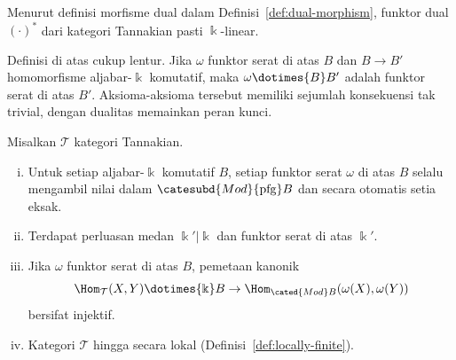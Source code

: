 Menurut definisi morfisme dual dalam Definisi~\ref{def:dual-morphism},
funktor dual $(\mathord\cdot)^*$ dari kategori Tannakian pasti
$\Bbbk$-linear.

Definisi di atas cukup lentur. Jika $\omega$ funktor serat di atas $B$
dan $B\to B'$ homomorfisme aljabar-$\Bbbk$ komutatif, maka
$\omega\dotimes{B}B'$ adalah funktor serat di atas $B'$. Aksioma-aksioma
tersebut memiliki sejumlah konsekuensi tak trivial, dengan dualitas
memainkan peran kunci.

\begin{lemma}\label{prop:Tannaka-generalities}
	Misalkan $\mathcal{T}$ kategori Tannakian.
	\begin{enumerate}[(i)]
		\item Untuk setiap aljabar-$\Bbbk$ komutatif $B$, setiap funktor serat
		$\omega$ di atas $B$ selalu mengambil nilai dalam
		$\catesubd{Mod}{\mathrm{pfg}}B$ dan secara otomatis setia eksak.
		\item Terdapat perluasan medan $\Bbbk'|\Bbbk$ dan funktor serat di
		atas $\Bbbk'$.
		\item Jika $\omega$ funktor serat di atas $B$, pemetaan kanonik
		\[ \Hom_{\mathcal{T}}(X,Y)\dotimes{\Bbbk}B\to
		\Hom_{\cated{Mod}B}(\omega(X),\omega(Y)) \]
		bersifat injektif.
		\item Kategori $\mathcal{T}$ hingga secara lokal
		(Definisi~\ref{def:locally-finite}).
	\end{enumerate}
\end{lemma}

